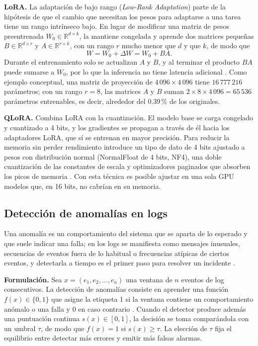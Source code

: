 \textbf{LoRA.} La adaptación de bajo rango (\textit{Low-Rank Adaptation}) parte de la hipótesis de que el cambio que necesitan los pesos para adaptarse a una tarea tiene un rango intrínseco bajo. En lugar de modificar una matriz de pesos preentrenada $W_0 \in \mathbb{R}^{d \times k}$, la mantiene congelada y aprende dos matrices pequeñas $B \in \mathbb{R}^{d \times r}$ y $A \in \mathbb{R}^{r \times k}$, con un rango $r$ mucho menor que $d$ y que $k$, de modo que
\begin{equation}
W = W_0 + \Delta W = W_0 + BA.
\end{equation}
Durante el entrenamiento solo se actualizan $A$ y $B$, y al terminar el producto $BA$ puede sumarse a $W_0$, por lo que la inferencia no tiene latencia adicional \cite{hu2022_lora}. Como ejemplo conceptual, una matriz de proyección de $4\,096 \times 4\,096$ tiene $16\,777\,216$ parámetros; con un rango $r = 8$, las matrices $A$ y $B$ suman $2 \times 8 \times 4\,096 = 65\,536$ parámetros entrenables, es decir, alrededor del 0.39\,\% de los originales.

\textbf{QLoRA.} Combina LoRA con la cuantización. El modelo base se carga congelado y cuantizado a 4 bits, y los gradientes se propagan a través de él hacia los adaptadores LoRA, que sí se entrenan en mayor precisión. Para reducir la memoria sin perder rendimiento introduce un tipo de dato de 4 bits ajustado a pesos con distribución normal (NormalFloat de 4 bits, NF4), una doble cuantización de las constantes de escala y optimizadores paginados que absorben los picos de memoria \cite{dettmers2023_qlora}. Con esta técnica es posible ajustar en una sola GPU modelos que, en 16 bits, no cabrían en su memoria.

\subsection{Detección de anomalías en logs}\label{sec:mt_anomalias}

Una anomalía es un comportamiento del sistema que se aparta de lo esperado y que suele indicar una falla; en los logs se manifiesta como mensajes inusuales, secuencias de eventos fuera de lo habitual o frecuencias atípicas de ciertos eventos, y detectarla a tiempo es el primer paso para resolver un incidente \cite{he2021_survey}.

\textbf{Formulación.} Sea $x = (e_1, e_2, \ldots, e_n)$ una ventana de $n$ eventos de log consecutivos. La detección de anomalías consiste en aprender una función $f(x) \in \{0, 1\}$ que asigne la etiqueta 1 si la ventana contiene un comportamiento anómalo o una falla y 0 en caso contrario \cite{he2021_survey}. Cuando el detector produce además una puntuación continua $s(x) \in [0, 1]$, la decisión se toma comparándola con un umbral $\tau$, de modo que $f(x) = 1$ si $s(x) \geq \tau$. La elección de $\tau$ fija el equilibrio entre detectar más errores y emitir más falsas alarmas.

